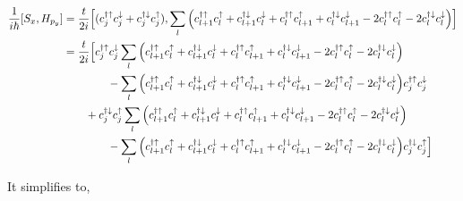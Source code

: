 \documentclass[10pt,prb,showpacs,amssymb,floatfix]{revtex4-1}
\newcommand{\dg}{\dagger}
\newcommand{\dna}{\downarrow}
\newcommand{\dn}{\downarrow}
\newcommand{\nn}{\nonumber}
\newcommand{\upa}{\uparrow}
\begin{document}
\begin{align}
\frac{1}{i\hbar}[S_x,H_{p_y}] &= \frac{t}{2i}\Big{[} (c_{j}^{\dg\upa} c_{j}^{\dna} + c_{j}^{\dg\dna} c_{j}^{\upa}) ,   \sum_{l}  \Big{(} c_{l+1}^{\dagger \upa} c_{l}^\upa + c_{l+1}^{\dagger \dn} c_{l}^\dn  +c_{l}^{\dagger \upa} c_{l+1}^\upa + c_{l}^{\dagger \dn} c_{l+1}^\dn  - 2 c_{l}^{\dagger \upa} c_{l}^\upa   - 2 c_{l}^{\dagger \dn} c_{l}^\dn  \Big{)} \Big{]} \\
&=  \frac{t}{2i} \Big{[}c_{j}^{\dg\upa} c_{j}^{\dna}  \sum_{l}  \Big{(} c_{l+1}^{\dagger \upa} c_{l}^\upa + c_{l+1}^{\dagger \dn} c_{l}^\dn  +c_{l}^{\dagger \upa} c_{l+1}^\upa + c_{l}^{\dagger \dn} c_{l+1}^\dn  - 2 c_{l}^{\dagger \upa} c_{l}^\upa   - 2 c_{l}^{\dagger \dn} c_{l}^\dn  \Big{)} \nn\\
&~~~~~~~~~~~~ -  \sum_{l}  \Big{(} c_{l+1}^{\dagger \upa} c_{l}^\upa + c_{l+1}^{\dagger \dn} c_{l}^\dn  +c_{l}^{\dagger \upa} c_{l+1}^\upa + c_{l}^{\dagger \dn} c_{l+1}^\dn  - 2 c_{l}^{\dagger \upa} c_{l}^\upa   - 2 c_{l}^{\dagger \dn} c_{l}^\dn  \Big{)} c_{j}^{\dg\upa} c_{j}^{\dna} \nn\\
 &~~~~~~ + c_{j}^{\dg\dna} c_{j}^{\upa}  \sum_{l}  \Big{(} c_{l+1}^{\dagger \upa} c_{l}^\upa + c_{l+1}^{\dagger \dn} c_{l}^\dn  +c_{l}^{\dagger \upa} c_{l+1}^\upa + c_{l}^{\dagger \dn} c_{l+1}^\dn  - 2 c_{l}^{\dagger \upa} c_{l}^\upa   - 2 c_{l}^{\dagger \dn} c_{l}^\dn  \Big{)} \nn\\
 &~~~~~~~~~~~~ -  \sum_{l}  \Big{(} c_{l+1}^{\dagger \upa} c_{l}^\upa + c_{l+1}^{\dagger \dn} c_{l}^\dn  +c_{l}^{\dagger \upa} c_{l+1}^\upa + c_{l}^{\dagger \dn} c_{l+1}^\dn  - 2 c_{l}^{\dagger \upa} c_{l}^\upa   - 2 c_{l}^{\dagger \dn} c_{l}^\dn  \Big{)}  c_{j}^{\dg\dna} c_{j}^{\upa} \Big{]}
\end{align}

It simplifies to,
\end{document}

